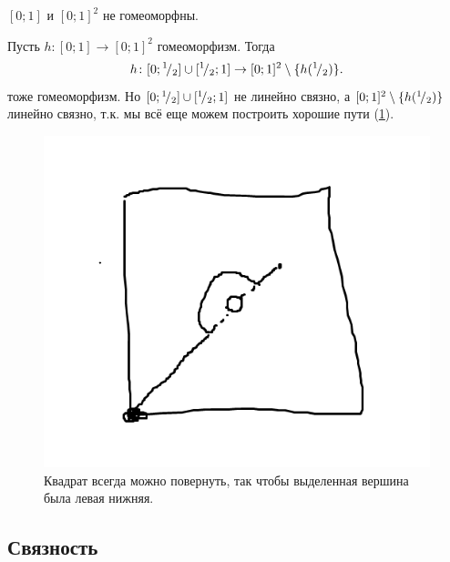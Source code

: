 \begin{example}
    $[0; 1]$ и $[0;1]^2$ не гомеоморфны. 

    Пусть $h\colon[0;1] \to [0;1]^2$ гомеоморфизм. Тогда \begin{equation}
        h\colon[0;{}^{1}\!/_{2}]\cup[{}^{1}\!/_{2}; 1]\to [0;1]^2 \setminus \{h({}^{1}\!/_{2})\}.
    \end{equation} тоже гомеоморфизм. Но $[0;{}^{1}\!/_{2}]\cup[{}^{1}\!/_{2}; 1]$ не линейно связно, а $[0;1]^2 \setminus \{h({}^{1}\!/_{2})\}$ линейно связно, т.к. мы всё еще можем построить хорошие пути (\cref{fig:square-proof}).
\begin{figure}[h]
    \centering
    \includegraphics[width=0.5\linewidth]{graphics/square-proof.png}
    \caption{Квадрат всегда можно повернуть, так чтобы выделенная вершина была левая нижняя.}
    \label{fig:square-proof}
\end{figure}
\end{example}

\subsection{Связность}

